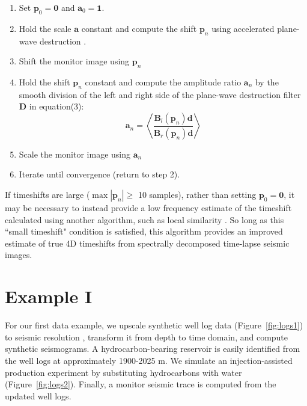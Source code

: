 \begin{enumerate}
\item Set $\mathbf{p}_0 = \mathbf{0}$ and $\mathbf{a}_0 = \mathbf{1}$.
\item Hold the scale $\mathbf{a}$ constant and compute the shift $\mathbf{p}_n$ using accelerated plane-wave destruction \cite[]{chen}.
\item Shift the monitor image using $\mathbf{p}_n$
\item Hold the shift $\mathbf{p}_n$ constant and compute the amplitude ratio $\mathbf{a}_n$ by the smooth division of the left and right side of the plane-wave destruction filter $\mathbf{D}$ in equation(3):
\begin{equation}
\mathbf{a}_n = \left<\frac{\mathbf{B}_l(\mathbf{p}_n)\mathbf{d}}{\mathbf{B}_r(\mathbf{p}_n)\mathbf{d}}\right>
\end{equation}
\item Scale the monitor image using $\mathbf{a}_n$
\item Iterate until convergence (return to step 2).
\end{enumerate}
 
If timeshifts are large ($\max |\mathbf{p}_n|\geq$ 10 samples), rather than setting $\mathbf{p}_0 = \mathbf{0}$, it may be necessary to instead provide a low frequency estimate of the timeshift calculated using another algorithm, such as local similarity \cite[]{fomel09}.
So long as this ``small timeshift" condition is satisfied, this algorithm provides an improved estimate of true 4D timeshifts from spectrally decomposed time-lapse seismic images.

\section{Example I}
For our first data example, we upscale synthetic well log data (Figure~\ref{fig:logs1}) to seismic resolution \cite[]{backus}, transform it from depth to time domain, and compute synthetic seismograms.
A hydrocarbon-bearing reservoir is easily identified from the well logs at approximately 1900-2025 m.
We simulate an injection-assisted production experiment by substituting hydrocarbons with water \cite[]{gassmann} (Figure~\ref{fig:logs2}).
Finally, a monitor seismic trace is computed from the updated well logs.


